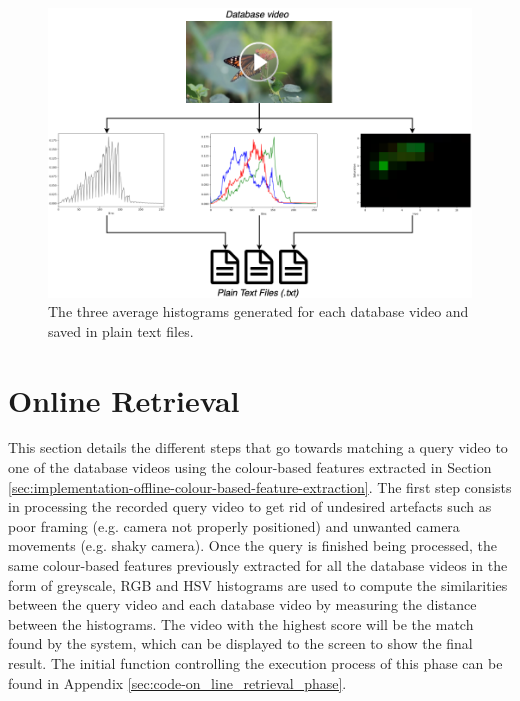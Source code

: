 \begin{figure}[h] 
\centerline{\includegraphics[width=\textwidth]{figures/implementation/all_avg_norm_histograms.png}}
\caption{\label{fig:implementation-all_avg_norm_histograms}The three average histograms generated for each database video and saved in plain text files.}
\end{figure}


\section{Online Retrieval}

This section details the different steps that go towards matching a query video to one of the database videos using the colour-based features extracted in Section \ref{sec:implementation-offline-colour-based-feature-extraction}. The first step consists in processing the recorded query video to get rid of undesired artefacts such as poor framing (e.g. camera not properly positioned) and unwanted camera movements (e.g. shaky camera). Once the query is finished being processed, the same colour-based features previously extracted for all the database videos in the form of greyscale, RGB and HSV histograms are used to compute the similarities between the query video and each database video by measuring the distance between the histograms. The video with the highest score will be the match found by the system, which can be displayed to the screen to show the final result. The initial function controlling the execution process of this phase can be found in Appendix \ref{sec:code-on_line_retrieval_phase}.

